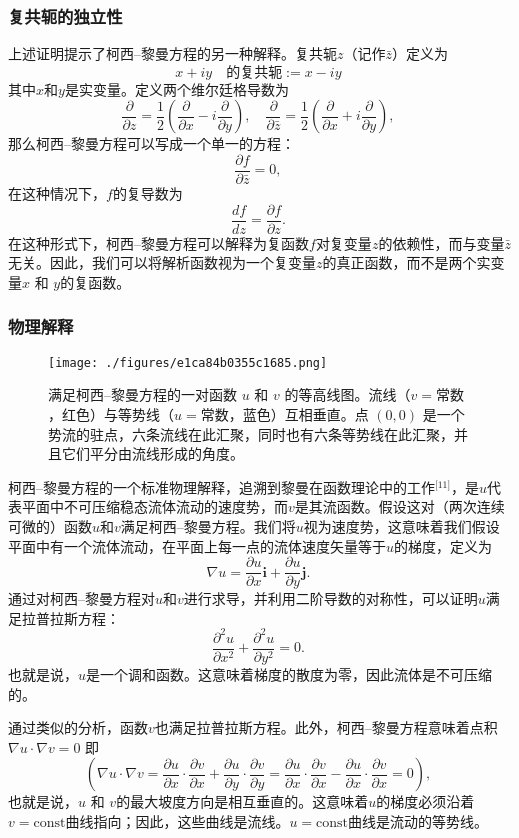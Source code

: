\subsubsection{复共轭的独立性}  
上述证明提示了柯西–黎曼方程的另一种解释。复共轭\( z \)（记作\( \bar{z} \)）定义为  
\[
x + iy \quad \text{的复共轭} := x - iy~
\]
其中\( x \)和\( y \)是实变量。定义两个维尔廷格导数为  
\[
\frac{\partial}{\partial z} = \frac{1}{2} \left( \frac{\partial}{\partial x} - i \frac{\partial}{\partial y} \right), \quad \frac{\partial}{\partial \bar{z}} = \frac{1}{2} \left( \frac{\partial}{\partial x} + i \frac{\partial}{\partial y} \right),~
\]
那么柯西–黎曼方程可以写成一个单一的方程：  
\[
\frac{\partial f}{\partial \bar{z}} = 0,~
\]
在这种情况下，\( f \)的复导数为  
\[
\frac{df}{dz} = \frac{\partial f}{\partial z}.~
\]
在这种形式下，柯西–黎曼方程可以解释为复函数\( f \)对复变量\( z \)的依赖性，而与变量\( \bar{z} \)无关。因此，我们可以将解析函数视为一个复变量\( z \)的真正函数，而不是两个实变量\( x \) 和 \( y \)的复函数。
\subsubsection{物理解释}
\begin{figure}[ht]
\centering
\texttt{[image: ./figures/e1ca84b0355c1685.png]}
\caption{满足柯西–黎曼方程的一对函数 \( u \) 和 \( v \) 的等高线图。流线（\( v = \text{常数} \)，红色）与等势线（\( u = \text{常数} \)，蓝色）互相垂直。点 \( (0, 0) \) 是一个势流的驻点，六条流线在此汇聚，同时也有六条等势线在此汇聚，并且它们平分由流线形成的角度。} \label{fig_KExiLM_2}
\end{figure}
柯西–黎曼方程的一个标准物理解释，追溯到黎曼在函数理论中的工作\(^\text{[11]}\)，是\( u \)代表平面中不可压缩稳态流体流动的速度势，而\( v \)是其流函数。假设这对（两次连续可微的）函数\( u \)和\( v \)满足柯西–黎曼方程。我们将\( u \)视为速度势，这意味着我们假设平面中有一个流体流动，在平面上每一点的流体速度矢量等于\( u \)的梯度，定义为  
\[
\nabla u = \frac{\partial u}{\partial x} \mathbf{i} + \frac{\partial u}{\partial y} \mathbf{j}.~
\]
通过对柯西–黎曼方程对\( u \)和\( v \)进行求导，并利用二阶导数的对称性，可以证明\( u \)满足拉普拉斯方程：  
\[
\frac{\partial^2 u}{\partial x^2} + \frac{\partial^2 u}{\partial y^2} = 0.~
\]
也就是说，\( u \)是一个调和函数。这意味着梯度的散度为零，因此流体是不可压缩的。

通过类似的分析，函数\( v \)也满足拉普拉斯方程。此外，柯西–黎曼方程意味着点积\(\nabla u \cdot \nabla v = 0\)
即  
\[
(\nabla u \cdot \nabla v = \frac{\partial u}{\partial x} \cdot \frac{\partial v}{\partial x} + \frac{\partial u}{\partial y} \cdot \frac{\partial v}{\partial y} = \frac{\partial u}{\partial x} \cdot \frac{\partial v}{\partial x} - \frac{\partial u}{\partial x} \cdot \frac{\partial v}{\partial x} = 0),~
\]
也就是说，\( u \) 和 \( v \)的最大坡度方向是相互垂直的。这意味着\( u \)的梯度必须沿着 \( v = \text{const} \)曲线指向；因此，这些曲线是流线。\( u = \text{const} \)曲线是流动的等势线。

